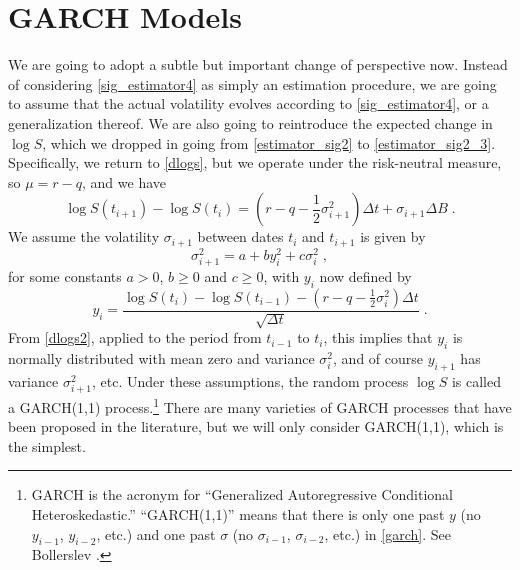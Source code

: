 \section{GARCH Models}\label{s_garch}

We are going to adopt a subtle but important change of perspective now.  Instead of considering \eqref{sig_estimator4} as simply an estimation procedure, we are going to assume that the actual volatility evolves according to \eqref{sig_estimator4}, or a generalization thereof.  We are also going to reintroduce the expected change in $\log S$, which we dropped in going from \eqref{estimator_sig2} to \eqref{estimator_sig2_3}.  Specifically, we return to \eqref{dlogs}, but we operate under the risk-neutral measure, so 
$\mu=r-q$, and we have
\begin{equation}\label{dlogs2}
\log S(t_{i+1}) - \log S(t_i) = \left(r-q-\frac{1}{2}\sigma_{i+1}^2\right)\varDelta t + \sigma_{i+1} \varDelta B\;.
\end{equation}
We assume the volatility $\sigma_{i+1}$ between dates $t_i$ and $t_{i+1}$ is given by
\begin{equation}\label{garch}
\sigma_{i+1}^2 = a + b y_{i}^2 + c \sigma_i^2\;,
\end{equation}
for some constants $a > 0$, $b\geq 0$ and $c\geq 0$, with $y_i$ now defined by
$$y_i = \frac{\log S(t_i)-\log S(t_{i-1})-\left(r-q-\frac{1}{2}\sigma_i^2\right)\varDelta t}{\sqrt{\varDelta t}}\; .$$
From \eqref{dlogs2}, applied to the period from $t_{i-1}$ to $t_i$, this implies that $y_i$ is normally distributed with mean zero and variance $\sigma_i^2$, and of course $y_{i+1}$ has variance $\sigma_{i+1}^2$, etc.  
Under these assumptions, the random process $\log S$ is called a  GARCH(1,1) process.\footnote{GARCH is the acronym for ``Generalized Autoregressive Conditional Heteroskedastic.''  ``GARCH(1,1)'' means that there is only one past $y$  (no $y_{i-1}$, $y_{i-2}$, etc.) and one past $\sigma$ (no  $\sigma_{i-1}$, $\sigma_{i-2}$, etc.) in  \eqref{garch}.  See Bollerslev \cite{Bollerslev}.}  There are many varieties of GARCH processes that have been proposed in the literature, but we will only consider GARCH(1,1), which is the simplest.

